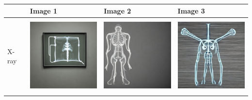 \begin{table}[H]
\centering
\begin{tabularx}{\linewidth}{@{}>{\centering\arraybackslash}m{3cm}>{\centering\arraybackslash}X>{\centering\arraybackslash}X>{\centering\arraybackslash}X@{}}
\toprule
 & Image 1 & Image 2 & Image 3 \\
\midrule
X-ray & \includegraphics[valign=M,width=\linewidth,height=4cm,keepaspectratio]{main/content/images/prior_concepts_sd/v2/xray/xray-0.jpg} & \includegraphics[valign=M,width=\linewidth,height=4cm,keepaspectratio]{main/content/images/prior_concepts_sd/v2/xray/xray-1.jpg} & \includegraphics[valign=M,width=\linewidth,height=4cm,keepaspectratio]{main/content/images/prior_concepts_sd/v2/xray/xray-2.jpg} \\
\midrule

\end{tabularx}
\end{table}
